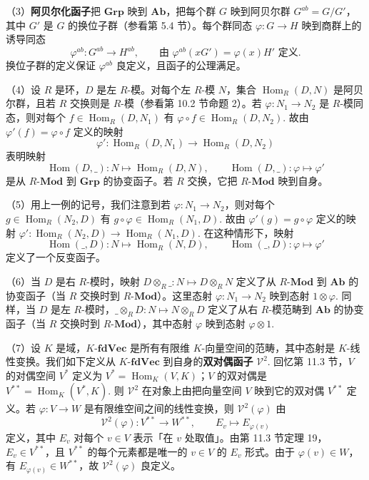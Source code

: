 （3）\textbf{阿贝尔化函子}把 \(\mathbf{Grp}\) 映到 \(\mathbf{Ab}\)，把每个群 \(G\) 映到阿贝尔群 \(G^{ab} = G/G'\)，其中 \(G'\) 是 \(G\) 的换位子群（参看第 5.4 节）。每个群同态 \(\varphi : G \to H\) 映到商群上的诱导同态
\[
\varphi^{ab} : G^{ab} \to H^{ab}, \qquad \text{由 } \varphi^{ab}(xG') = \varphi(x)H' \text{ 定义}.
\]
换位子群的定义保证 \(\varphi^{ab}\) 良定义，且函子的公理满足。

（4）设 \(R\) 是环，\(D\) 是左 \(R\)-模。对每个左 \(R\)-模 \(N\)，集合 \(\operatorname{Hom}_R(D, N)\) 是阿贝尔群，且若 \(R\) 交换则是 \(R\)-模（参看第 10.2 节命题 2）。若 \(\varphi : N_1 \to N_2\) 是 \(R\)-模同态，则对每个 \(f \in \operatorname{Hom}_R(D, N_1)\) 有 \(\varphi \circ f \in \operatorname{Hom}_R(D, N_2)\). 故由 \(\varphi'(f) = \varphi \circ f\) 定义的映射
\[
\varphi' : \operatorname{Hom}_R(D, N_1) \to \operatorname{Hom}_R(D, N_2)
\]
表明映射
\[
\operatorname{Hom}(D, \_): N \mapsto \operatorname{Hom}_R(D, N), \qquad \operatorname{Hom}(D, \_): \varphi \mapsto \varphi'
\]
是从 \(R\text{-}\mathbf{Mod}\) 到 \(\mathbf{Grp}\) 的协变函子。若 \(R\) 交换，它把 \(R\text{-}\mathbf{Mod}\) 映到自身。

（5）用上一例的记号，我们注意到若 \(\varphi : N_1 \to N_2\)，则对每个 \(g \in \operatorname{Hom}_R(N_2, D)\) 有 \(g \circ \varphi \in \operatorname{Hom}_R(N_1, D)\). 故由 \(\varphi'(g) = g \circ \varphi\) 定义的映射 \(\varphi' : \operatorname{Hom}_R(N_2, D) \to \operatorname{Hom}_R(N_1, D)\). 在这种情形下，映射
\[
\operatorname{Hom}(\_, D): N \mapsto \operatorname{Hom}_R(N, D), \qquad \operatorname{Hom}(\_, D): \varphi \mapsto \varphi'
\]
定义了一个反变函子。

（6）当 \(D\) 是右 \(R\)-模时，映射 \(D \otimes_R \_: N \mapsto D \otimes_R N\) 定义了从 \(R\text{-}\mathbf{Mod}\) 到 \(\mathbf{Ab}\) 的协变函子（当 \(R\) 交换时到 \(R\text{-}\mathbf{Mod}\)）。这里态射 \(\varphi : N_1 \to N_2\) 映到态射 \(1 \otimes \varphi\). 同样，当 \(D\) 是左 \(R\)-模时，\(\_ \otimes_R D : N \mapsto N \otimes_R D\) 定义了从右 \(R\)-模范畴到 \(\mathbf{Ab}\) 的协变函子（当 \(R\) 交换时到 \(R\text{-}\mathbf{Mod}\)），其中态射 \(\varphi\) 映到态射 \(\varphi \otimes 1\).

（7）设 \(K\) 是域，\(K\text{-}\mathbf{fdVec}\) 是所有有限维 \(K\)-向量空间的范畴，其中态射是 \(K\)-线性变换。我们如下定义从 \(K\text{-}\mathbf{fdVec}\) 到自身的\textbf{双对偶函子} \(\mathcal{V}^2\). 回忆第 11.3 节，\(V\) 的对偶空间 \(V^*\) 定义为 \(V^* = \operatorname{Hom}_K(V, K)\)；\(V\) 的双对偶是 \(V^{**} = \operatorname{Hom}_K(V^*, K)\). 则 \(\mathcal{V}^2\) 在对象上由把向量空间 \(V\) 映到它的双对偶 \(V^{**}\) 定义。若 \(\varphi : V \to W\) 是有限维空间之间的线性变换，则 \(\mathcal{V}^2(\varphi)\) 由
\[
\mathcal{V}^2(\varphi) : V^{**} \to W^{**}, \qquad E_v \mapsto E_{\varphi(v)}
\]
定义，其中 \(E_v\) 对每个 \(v \in V\) 表示「在 \(v\) 处取值」。由第 11.3 节定理 19，\(E_v \in V^{**}\)，且 \(V^{**}\) 的每个元素都是唯一的 \(v \in V\) 的 \(E_v\) 形式。由于 \(\varphi(v) \in W\)，有 \(E_{\varphi(v)} \in W^{**}\)，故 \(\mathcal{V}^2(\varphi)\) 良定义。

